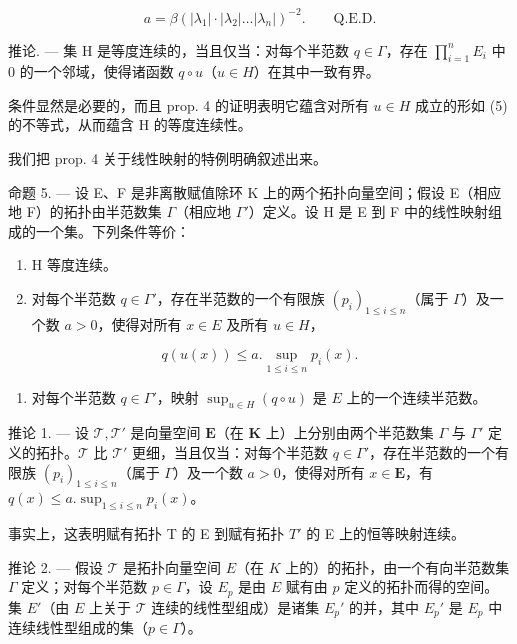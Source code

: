 \[
a = \beta (| \lambda_ {1} | \cdot | \lambda_ {2} | \dots | \lambda_ {n} |) ^ {- 2}. \qquad \text{Q.E.D.}
\]

推论. --- 集 H 是等度连续的，当且仅当：对每个半范数 \(q \in \Gamma\)，存在 \(\prod_{i=1}^{n} E_{i}\) 中 0 的一个邻域，使得诸函数 \(q \circ u\)（\(u \in H\)）在其中一致有界。

条件显然是必要的，而且 prop. 4 的证明表明它蕴含对所有 \(u \in H\) 成立的形如 (5) 的不等式，从而蕴含 H 的等度连续性。

我们把 prop. 4 关于线性映射的特例明确叙述出来。

命题 5. --- 设 E、F 是非离散赋值除环 K 上的两个拓扑向量空间；假设 E（相应地 F）的拓扑由半范数集 \(\Gamma\)（相应地 \(\Gamma'\)）定义。设 H 是 E 到 F 中的线性映射组成的一个集。下列条件等价：

\begin{enumerate}
\def\labelenumi{\alph{enumi})}
\item
  H 等度连续。
\item
  对每个半范数 \(q \in \Gamma'\)，存在半范数的一个有限族 \((p_i)_{1 \leq i \leq n}\)（属于 \(\Gamma\)）及一个数 \(a > 0\)，使得对所有 \(x \in E\) 及所有 \(u \in H\)，
\end{enumerate}

\[
q (u (x)) \leqslant a. \sup _ {1 \leqslant i \leqslant n} p _ {i} (x).\tag{7}
\]

\begin{enumerate}
\def\labelenumi{\alph{enumi})}
\setcounter{enumi}{2}
\tightlist
\item
  对每个半范数 \(q \in \Gamma'\)，映射 \(\sup_{u \in H} (q \circ u)\) 是 \(E\) 上的一个连续半范数。
\end{enumerate}

推论 1. --- 设 \(\mathcal{T}, \mathcal{T}'\) 是向量空间 \(\mathbf{E}\)（在 \(\mathbf{K}\) 上）上分别由两个半范数集 \(\Gamma\) 与 \(\Gamma'\) 定义的拓扑。\(\mathcal{T}\) 比 \(\mathcal{T}'\) 更细，当且仅当：对每个半范数 \(q \in \Gamma'\)，存在半范数的一个有限族 \((p_i)_{1 \leqslant i \leqslant n}\)（属于 \(\Gamma\)）及一个数 \(a > 0\)，使得对所有 \(x \in \mathbf{E}\)，有 \(q(x) \leqslant a . \sup_{1 \leqslant i \leqslant n} p_i(x)\)。

事实上，这表明赋有拓扑 T 的 E 到赋有拓扑 \(T'\) 的 E 上的恒等映射连续。

推论 2. --- 假设 \(\mathcal{T}\) 是拓扑向量空间 \(E\)（在 \(K\) 上的）的拓扑，由一个有向半范数集 \(\Gamma\) 定义；对每个半范数 \(p \in \Gamma\)，设 \(E_p\) 是由 \(E\) 赋有由 \(p\) 定义的拓扑而得的空间。集 \(E'\)（由 \(E\) 上关于 \(\mathcal{T}\) 连续的线性型组成）是诸集 \(E_p'\) 的并，其中 \(E_p'\) 是 \(E_p\) 中连续线性型组成的集（\(p \in \Gamma\)）。

